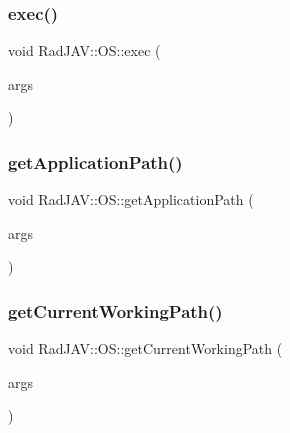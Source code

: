 \mbox{\label{class_rad_j_a_v_1_1_o_s_a0a0c9a7193e16bcad860e84c3802a709}} 
\subsubsection{\texorpdfstring{exec()}{exec()}}
{\footnotesize\ttfamily void Rad\+J\+A\+V\+::\+O\+S\+::exec (\begin{DoxyParamCaption}\item[{const v8\+::\+Function\+Callback\+Info$<$ v8\+::\+Value $>$ \&}]{args }\end{DoxyParamCaption})\hspace{0.3cm}{\ttfamily [static]}}

\mbox{\label{class_rad_j_a_v_1_1_o_s_a8430cf53e13cdb19f1257ea1c98ff20d}} 
\subsubsection{\texorpdfstring{get\+Application\+Path()}{getApplicationPath()}}
{\footnotesize\ttfamily void Rad\+J\+A\+V\+::\+O\+S\+::get\+Application\+Path (\begin{DoxyParamCaption}\item[{const v8\+::\+Function\+Callback\+Info$<$ v8\+::\+Value $>$ \&}]{args }\end{DoxyParamCaption})\hspace{0.3cm}{\ttfamily [static]}}

\mbox{\label{class_rad_j_a_v_1_1_o_s_a77a5688a5d892b20aa2c5ae508c6e07d}} 
\subsubsection{\texorpdfstring{get\+Current\+Working\+Path()}{getCurrentWorkingPath()}}
{\footnotesize\ttfamily void Rad\+J\+A\+V\+::\+O\+S\+::get\+Current\+Working\+Path (\begin{DoxyParamCaption}\item[{const v8\+::\+Function\+Callback\+Info$<$ v8\+::\+Value $>$ \&}]{args }\end{DoxyParamCaption})\hspace{0.3cm}{\ttfamily [static]}}

